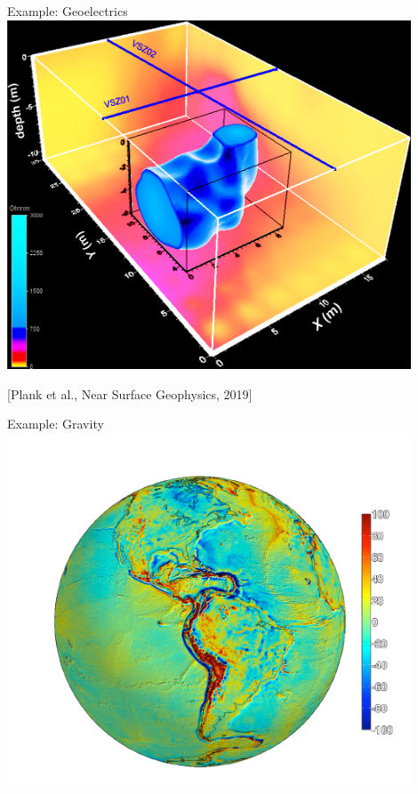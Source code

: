 \begin{frame}
    \begin{PointSix}{Example: Geoelectrics}
        \includegraphics[width=0.9\textwidth]{Figures/General/GeophysExamples/DCElectricsSinkhole_Plank2019NearSurfaceGeophys_Reversed.png}

        \tiny[Plank et al., Near Surface Geophysics, 2019]
        \end{PointSix}
\end{frame}

\begin{frame}
    \begin{PointSix}{Example: Gravity}
        \includegraphics[width=0.90\textwidth]{Figures/Gravity/Exported/Grace_JPLCaltect_FODT10_WithoutPeople.png}
    \end{PointSix}
\end{frame}



